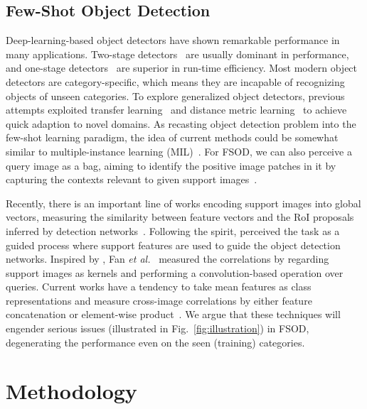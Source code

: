 \documentclass[journal]{IEEEtran}
\newcommand{\etal}{\textit{et al.}}
\begin{document}
\subsection{Few-Shot Object Detection}
Deep-learning-based object detectors have shown remarkable performance in many applications.
Two-stage detectors~\cite{girshick2014rich, girshick2015fast, ren2015faster, lin2017feature} are usually dominant in performance, and one-stage detectors~\cite{lin2017focal, law2018cornernet, tian2019fcos, zhou2019objects} are superior in run-time efficiency.
Most modern object detectors are category-specific, which means they are incapable of recognizing objects of unseen categories.
To explore generalized object detectors, previous attempts exploited transfer learning~\cite{chen2018lstd} and distance metric learning~\cite{karlinsky2019repmet} to achieve quick adaption to novel domains.
As recasting object detection problem into the few-shot learning paradigm, the idea of current methods could be somewhat similar to multiple-instance learning (MIL)~\cite{qi2007concurrent, dollar2008multiple, babenko2010robust}.
For FSOD, we can also perceive a query image as a bag, aiming to identify the positive image patches in it by capturing the contexts relevant to given support images~\cite{qi2007concurrent}.


Recently, there is an important line of works encoding support images into global vectors, measuring the similarity between feature vectors and the RoI proposals inferred by detection networks~\cite{kang2019few, yan2019meta}.
Following the spirit, \cite{fan2020fgn} perceived the task as a guided process where support features are used to guide the object detection networks.
Inspired by \cite{bertinetto2016fully}, Fan \etal~\cite{fan2020few} measured the correlations by regarding support images as kernels and performing a convolution-based operation over queries.
Current works have a tendency to take mean features as class representations and measure cross-image correlations by either feature concatenation or element-wise product~\cite{yan2019meta, karlinsky2019repmet, fan2020fgn, fan2020few}.
We argue that these techniques will engender serious issues (illustrated in Fig.~\ref{fig:illustration}) in FSOD, degenerating the performance even on the seen (training) categories.




\section{Methodology}
\end{document}
